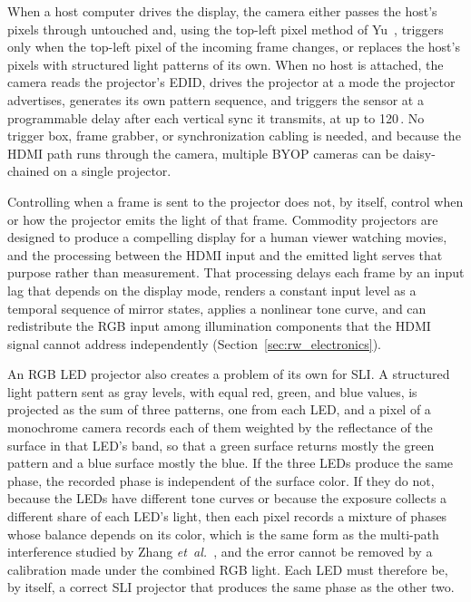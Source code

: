 \documentclass[10pt,journal,compsoc]{IEEEtran}
\newcommand{\SI}[2]{#1\,#2}
\begin{document}
When a host computer drives the display, the camera
either passes the host's pixels through untouched and, using the top-left pixel method of
Yu~\cite{yu2019dissertation}, triggers only when the top-left pixel of the incoming
frame changes, or
replaces the host's pixels with structured light patterns of its own. When no host is attached,
the camera reads the projector's EDID, drives the projector at a mode the projector advertises,
generates its own pattern sequence, and triggers the sensor at a programmable delay after each
vertical sync it transmits, at up to \SI{120}{\hertz}. No trigger box, frame grabber, or
synchronization cabling is needed, and because the HDMI path runs through the camera, multiple
BYOP cameras can be daisy-chained on a single projector.

Controlling when a frame is sent to the projector does not, by itself, control when or how the
projector emits the light of that frame. Commodity projectors are designed to produce a
compelling display for a human viewer watching movies, and the processing between the HDMI input
and the emitted light serves that purpose rather than measurement. That processing delays each
frame by an input lag that depends on the display mode, renders a constant input level as a
temporal sequence of mirror states, applies a nonlinear tone curve, and can redistribute the RGB
input among illumination components that the HDMI signal cannot address independently
(Section~\ref{sec:rw_electronics}).

An RGB LED projector also creates a problem of its own for SLI. A structured light pattern sent
as gray levels, with equal red, green, and blue values, is projected as the sum of three
patterns, one from each LED, and a pixel of a monochrome camera records each of them
weighted by the reflectance of the surface in that LED's band, so that a green surface returns
mostly the green pattern and a blue surface mostly the blue. If the three LEDs produce the same
phase, the recorded phase is independent of the surface color. If they do not, because the LEDs
have different tone curves or because the exposure collects a different share of each LED's
light, then each pixel records a mixture of phases whose balance depends on its color, which is
the same form as the multi-path interference studied by Zhang
\emph{et~al.}~\cite{zhang2019bimodal,zhang2024bimodalps}, and the error cannot be removed by a
calibration made under the combined RGB light. Each LED must therefore be, by itself, a correct
SLI projector that produces the same phase as the other two.
\end{document}
